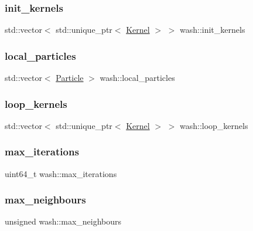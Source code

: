 \subsubsection{\texorpdfstring{init\+\_\+kernels}{init\_kernels}}
{\footnotesize\ttfamily std\+::vector$<$ std\+::unique\+\_\+ptr$<$ \mbox{\hyperlink{classwash_1_1Kernel}{Kernel}} $>$ $>$ wash\+::init\+\_\+kernels}

\mbox{\label{namespacewash_acb289595df7b8e6626daeeb132e1c445}} 
\subsubsection{\texorpdfstring{local\+\_\+particles}{local\_particles}}
{\footnotesize\ttfamily std\+::vector$<$ \mbox{\hyperlink{classwash_1_1Particle}{Particle}} $>$ wash\+::local\+\_\+particles}

\mbox{\label{namespacewash_a5de57cfe1510fe6ee588720a6776fc13}} 
\subsubsection{\texorpdfstring{loop\+\_\+kernels}{loop\_kernels}}
{\footnotesize\ttfamily std\+::vector$<$ std\+::unique\+\_\+ptr$<$ \mbox{\hyperlink{classwash_1_1Kernel}{Kernel}} $>$ $>$ wash\+::loop\+\_\+kernels}

\mbox{\label{namespacewash_a7c97ecfdda83ead3747575f282914fc7}} 
\subsubsection{\texorpdfstring{max\+\_\+iterations}{max\_iterations}}
{\footnotesize\ttfamily uint64\+\_\+t wash\+::max\+\_\+iterations}

\mbox{\label{namespacewash_a17d27449eff38aaca1e4206070bbb868}} 
\subsubsection{\texorpdfstring{max\+\_\+neighbours}{max\_neighbours}}
{\footnotesize\ttfamily unsigned wash\+::max\+\_\+neighbours}

